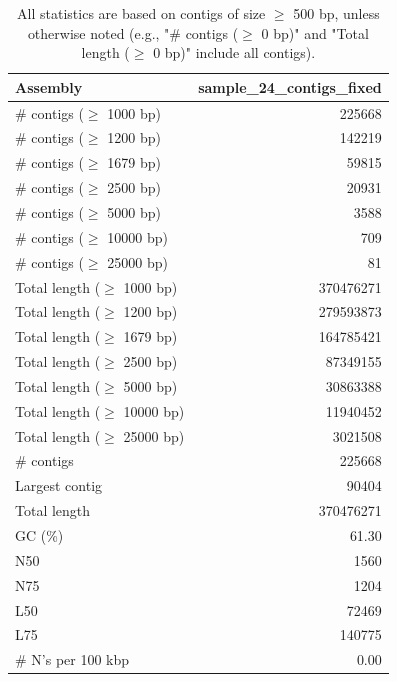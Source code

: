 \documentclass[12pt,a4paper]{article}
\begin{document}
\begin{table}[ht]
\begin{center}
\caption{All statistics are based on contigs of size $\geq$ 500 bp, unless otherwise noted (e.g., "\# contigs ($\geq$ 0 bp)" and "Total length ($\geq$ 0 bp)" include all contigs).}
\begin{tabular}{|l*{1}{|r}|}
\hline
Assembly & sample\_24\_contigs\_fixed \\ \hline
\# contigs ($\geq$ 1000 bp) & 225668 \\ \hline
\# contigs ($\geq$ 1200 bp) & 142219 \\ \hline
\# contigs ($\geq$ 1679 bp) & 59815 \\ \hline
\# contigs ($\geq$ 2500 bp) & 20931 \\ \hline
\# contigs ($\geq$ 5000 bp) & 3588 \\ \hline
\# contigs ($\geq$ 10000 bp) & 709 \\ \hline
\# contigs ($\geq$ 25000 bp) & 81 \\ \hline
Total length ($\geq$ 1000 bp) & 370476271 \\ \hline
Total length ($\geq$ 1200 bp) & 279593873 \\ \hline
Total length ($\geq$ 1679 bp) & 164785421 \\ \hline
Total length ($\geq$ 2500 bp) & 87349155 \\ \hline
Total length ($\geq$ 5000 bp) & 30863388 \\ \hline
Total length ($\geq$ 10000 bp) & 11940452 \\ \hline
Total length ($\geq$ 25000 bp) & 3021508 \\ \hline
\# contigs & 225668 \\ \hline
Largest contig & 90404 \\ \hline
Total length & 370476271 \\ \hline
GC (\%) & 61.30 \\ \hline
N50 & 1560 \\ \hline
N75 & 1204 \\ \hline
L50 & 72469 \\ \hline
L75 & 140775 \\ \hline
\# N's per 100 kbp & 0.00 \\ \hline
\end{tabular}
\end{center}
\end{table}
\end{document}
